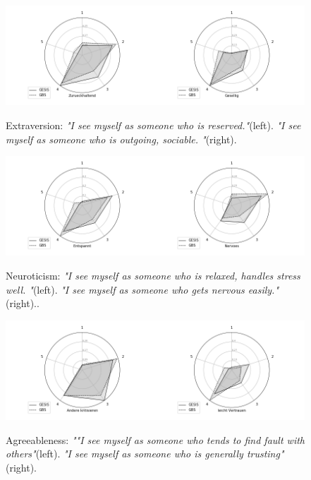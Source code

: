                 \begin{figure}[ht]
                \begin{center}
                   \includegraphics[scale=0.55,angle=0]{fig/Extraversionfigure}
	         \label{Extraversion}
	         \caption{Extraversion: \textit{"I see myself as someone who is reserved."}(left). \textit{"I see myself as someone who is outgoing, sociable. "}(right).}
                \end{center}
                \end{figure}

                \begin{figure}[ht]
                \begin{center}
                   \includegraphics[scale=0.55,angle=0]{fig/Neuroticismfigure}
	         \label{Neuroticism}
	         \caption{Neuroticism: \textit{"I see myself as someone who is relaxed, handles stress well. "}(left). \textit{"I see myself as someone who gets nervous easily."}(right)..}
                \end{center}
                \end{figure}

                \begin{figure}[ht]
                \begin{center}
                   \includegraphics[scale=0.75,angle=0]{fig/Agreeablenessfigure}
	         \label{Agreeableness}
	         \caption{Agreeableness: \textit{""I see myself as someone who tends to find fault with others"}(left). \textit{"I see myself as someone who is generally trusting"}(right).}
                \end{center}
                \end{figure}

